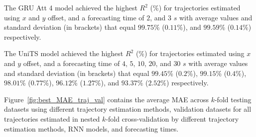 \begin{table}[!ht]
	\centering
	\caption{The average $R^{2}$ (\%), with standard deviation in brackets, across $k$-fold validation datasets for the trajectories in the $k$-fold testing datasets estimated using $x$ and $y$ offset, different RNN models, and forecasting times.}
	\label{tab:best_no_abs_R2}
\end{table}

The GRU Att 4 model achieved the highest $R^{2}$ (\%) for trajectories estimated using $x$ and $y$ offset, and a forecasting time of $2$, and $3$ $s$ with average values and standard deviation (in brackets) that equal $99.75$\% ($0.11$\%), and $99.59$\% ($0.14$\%) respectively.

The UniTS model achieved the highest $R^{2}$ (\%) for trajectories estimated using $x$ and $y$ offset, and a forecasting time of $4$, $5$, $10$, $20$, and $30$ $s$ with average values and standard deviation (in brackets) that equal $99.45$\% ($0.2$\%), $99.15$\% ($0.4$\%), $98.01$\% ($0.77$\%), $96.12$\% ($1.27$\%), and $93.37$\% ($2.52$\%) respectively.

Figure~\ref{fig:best_MAE_traj_val} contains the average MAE across $k$-fold testing datasets using different trajectory estimation methods, validation datasets for all trajectories estimated in nested $k$-fold cross-validation by different trajectory estimation methods, RNN models, and forecasting times.

